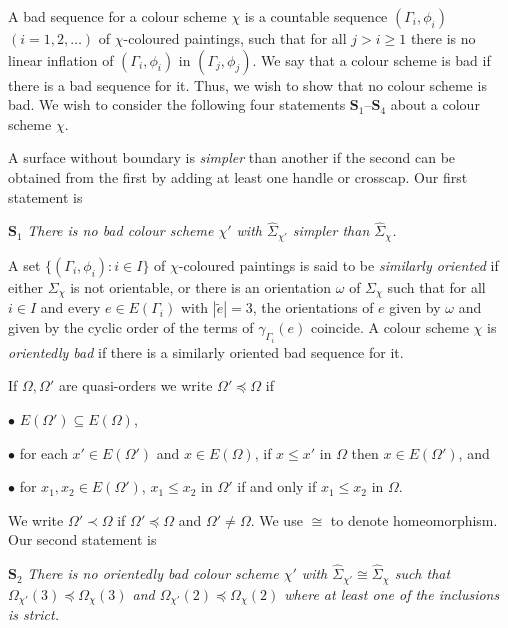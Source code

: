 A bad sequence for a colour scheme $\chi$ is a countable sequence $(\Gamma_i,\phi_i)$ $(i=1,2,\dots)$ of $\chi$-coloured paintings, such that for all $j>i\ge 1$ there is no linear inflation of $(\Gamma_i,\phi_i)$ in $(\Gamma_j,\phi_j)$. We say that a colour scheme is bad if there is a bad sequence for it. Thus, we wish to show that no colour scheme is bad. We wish to consider the following four statements $\mathbf{S}_1\text{--}\mathbf{S}_4$ about a colour scheme $\chi$.

A surface without boundary is \textit{simpler} than another if the second can be obtained from the first by adding at least one handle or crosscap. Our first statement is

$\mathbf{S}_1$ \textit{There is no bad colour scheme $\chi'$ with $\hat{\Sigma}_{\chi'}$ simpler than $\hat{\Sigma}_\chi$.}

A set $\{(\Gamma_i,\phi_i):i\in I\}$ of $\chi$-coloured paintings is said to be \textit{similarly oriented} if either $\Sigma_\chi$ is not orientable, or there is an orientation $\omega$ of $\Sigma_\chi$ such that for all $i\in I$ and every $e\in E(\Gamma_i)$ with $|\tilde{e}|=3$, the orientations of $e$ given by $\omega$ and given by the cyclic order of the terms of $\gamma_{\Gamma_i}(e)$ coincide. A colour scheme $\chi$ is \textit{orientedly bad} if there is a similarly oriented bad sequence for it.

If $\Omega,\Omega'$ are quasi-orders we write $\Omega'\preceq \Omega$ if

\hspace*{12pt}$\bullet$ $E(\Omega')\subseteq E(\Omega)$,

\hspace*{12pt}$\bullet$ for each $x'\in E(\Omega')$ and $x\in E(\Omega)$, if $x\le x'$ in $\Omega$ then $x\in E(\Omega')$, and

\hspace*{12pt}$\bullet$ for $x_1,x_2\in E(\Omega')$, $x_1\le x_2$ in $\Omega'$ if and only if $x_1\le x_2$ in $\Omega$.

We write $\Omega'\prec \Omega$ if $\Omega'\preceq \Omega$ and $\Omega'\ne \Omega$. We use $\cong$ to denote homeomorphism. Our second statement is

$\mathbf{S}_2$ \textit{There is no orientedly bad colour scheme $\chi'$ with $\hat{\Sigma}_{\chi'}\cong \hat{\Sigma}_\chi$ such that $\Omega_{\chi'}(3)\preceq \Omega_\chi(3)$ and $\Omega_{\chi'}(2)\preceq \Omega_\chi(2)$ where at least one of the inclusions is strict.}

